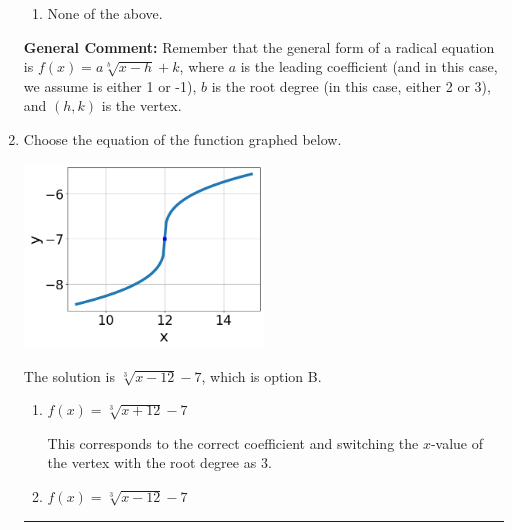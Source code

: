 \documentclass{extbook}[14pt]
\newcommand{\litem}[1]{\item #1

\rule{\textwidth}{0.4pt}}
\begin{document}
\begin{enumerate}
{\begin{enumerate}[label=\Alph*.]
\item None of the above.\end{enumerate}
\textbf{General Comment:} Remember that the general form of a radical equation is $ f(x) = a \sqrt[b]{x - h} + k $, where $a$ is the leading coefficient (and in this case, we assume is either 1 or -1), $b$ is the root degree (in this case, either 2 or 3), and $(h, k)$ is the vertex.
}
\litem{
Choose the equation of the function graphed below.

\begin{center}
    \includegraphics[width=0.5\textwidth]{../Figures/radicalGraphToEquationB.png}
\end{center}


The solution is \( \sqrt[3]{x - 12} - 7 \), which is option B.\begin{enumerate}[label=\Alph*.]
\item \( f(x) = \sqrt[3]{x + 12} - 7 \)

This corresponds to the correct coefficient and switching the $x$-value of the vertex with the root degree as $3$.
\item \( f(x) = \sqrt[3]{x - 12} - 7 \)


\end{enumerate}}
\end{enumerate}
\end{document}
